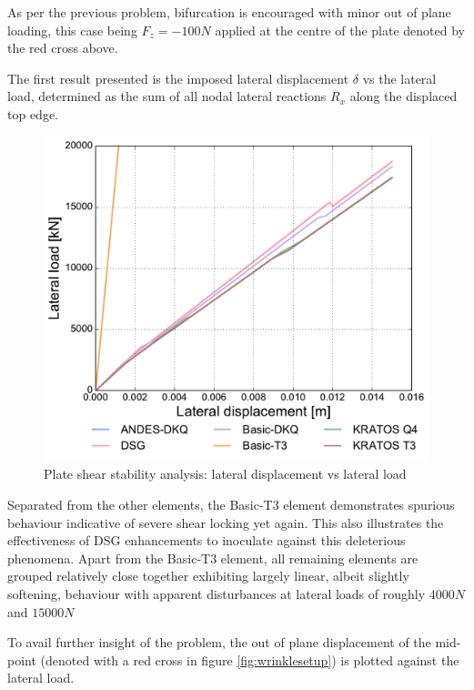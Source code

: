 As per the previous problem, bifurcation is encouraged with minor out of plane loading, this case being $F_z = -100N$ applied at the centre of the plate denoted by the red cross above. 

The first result presented is the imposed lateral displacement $\delta$ vs the lateral load, determined as the sum of all nodal lateral reactions $R_x$ along the displaced top edge.

\begin{figure}[H]
	\centering
	\def\svgwidth{\columnwidth}
	\includegraphics[width=12cm]{images/stability_wrinkle_axial_disp.pdf}
	\caption{Plate shear stability analysis: lateral displacement vs lateral load}
	\label{pic:wrinkle1}
\end{figure}

Separated from the other elements, the Basic-T3 element demonstrates spurious behaviour indicative of severe shear locking yet again. This also illustrates the effectiveness of DSG enhancements to inoculate against this deleterious phenomena. Apart from the Basic-T3 element, all remaining elements are grouped relatively close together exhibiting largely linear, albeit slightly softening, behaviour with apparent disturbances at lateral loads of roughly $4000N$ and $15000N$

To avail further insight of the problem, the out of plane displacement of the mid-point (denoted with a red cross in figure \ref{fig:wrinklesetup}) is plotted against the lateral load.

